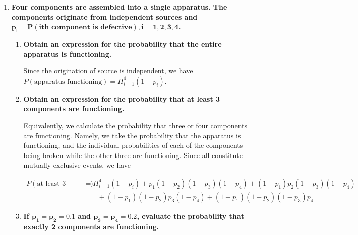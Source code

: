 \documentclass[10pt, oneside]{article}
\begin{document}
\begin{enumerate}[label=8.\arabic*]
\begin{enumerate}
	\end{enumerate}

\item  \begin{tcolorbox}[
  colback=Cerulean!5!white,
  colframe=Cerulean!75!black]
\textbf{Four components are assembled into a single apparatus. The components originate from independent sources and $\bm{p_i = P(i\text{th component is defective}), i = 1, 2, 3, 4}$.}
\end{tcolorbox}

	\begin{enumerate}
	\item  \begin{tcolorbox}[
	  colback=Cerulean!5!white,
	  colframe=Cerulean!75!black]
	\textbf{Obtain an expression for the probability that the entire apparatus is functioning.}
	\end{tcolorbox}
	
	Since the origination of source is independent, we have $\boxed{ P(\text{apparatus functioning}) = \Pi^4_{i=1} (1-p_i) }$.
	
	\item  \begin{tcolorbox}[
	  colback=Cerulean!5!white,
	  colframe=Cerulean!75!black]
	\textbf{Obtain an expression for the probability that at least 3 components are functioning.}
	\end{tcolorbox}
	
	Equivalently, we calculate the probability that three or four components are functioning. Namely, we take the probability that the apparatus is functioning, and the individual probabilities of each of the components being broken while the other three are functioning. Since all constitute mutually exclusive events, we have
	
	\begin{align*}
	P(\text{at least 3 functioning}) &= \Pi^4_{i=1} (1-p_i) + p_1 (1-p_2)(1-p_3)(1-p_4) + (1-p_1) p_2 (1-p_3) (1-p_4)  \\
	&\quad \quad + (1-p_1)(1-p_2) p_3 (1-p_4) + (1-p_1) (1- p_2) (1-p_3) p_4
	\end{align*}
	
	\item  \begin{tcolorbox}[
	  colback=Cerulean!5!white,
	  colframe=Cerulean!75!black]
	\textbf{If $\bm{p_1 = p_2 = 0.1}$ and $\bm{p_3 = p_4 = 0.2}$, evaluate the probability that exactly 2 components are functioning.}
	\end{tcolorbox}
	

\end{enumerate}
\end{enumerate}
\end{document}

